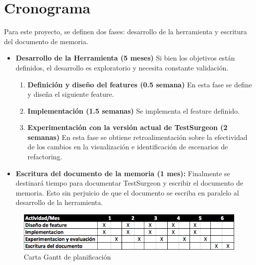 \documentclass[12pt,spanish,letterpaper]{article}
\begin{document}
\section{Cronograma}
\par Para este proyecto, se definen dos fases: desarrollo de la herramienta y escritura del documento de memoria.  
\begin{itemize}
	\item \textbf{Desarrollo de la Herramienta (5 meses)} Si bien los objetivos están definidos, el desarrollo es exploratorio y necesita constante validación. 
		\begin{enumerate}
			\item \textbf{Definición y diseño del features (0.5 semana)} En esta fase se define y diseña el siguiente feature.
			\item \textbf{Implementación (1.5 semanas)} Se implementa el feature definido. 
			\item \textbf{Experimentación con la versión actual de TestSurgeon (2 semanas)} En esta fase se obtiene retroalimentación sobre la efectividad de los cambios en la visualización e identificación de escenarios de refactoring.
		\end{enumerate}
	\item \textbf{Escritura del documento de la memoria (1 mes):} Finalmente se destinará tiempo para documentar TestSurgeon y escribir el documento de memoria. Esto sin perjuicio de que el documento se escriba en paralelo al desarrollo de la herramienta.
\end{itemize}

\vspace*{0.5cm}

\begin{figure}[h!]
	\centering
    \includegraphics[scale=0.8]{carta_gantt.png}
	\caption{Carta Gantt de planificación}	
		\label{blueprint-cls-mtds}
\end{figure}

\newpage
\end{document}
